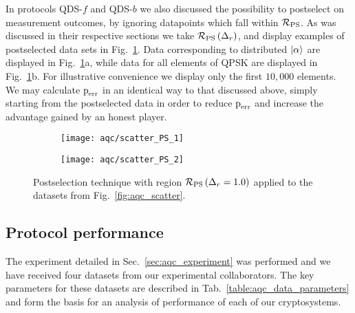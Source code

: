 In protocols QDS-$f$ and QDS-$b$ we also discussed the possibility to postselect on measurement outcomes, by ignoring datapoints which fall within $\mathcal{R}_{\text{PS}}$. As was discussed in their respective sections we take $\mathcal{R}_{\text{PS}}\left(\Delta_r\right)$, and display examples of postselected data sets in Fig.~\ref{fig:aqc_ps}. Data corresponding to distributed $\ket{\alpha}$ are displayed in Fig.~\ref{fig:aqc_ps}a, while data for all elements of QPSK are displayed in Fig.~\ref{fig:aqc_ps}b. For illustrative convenience we display only the first $10,000$ elements. We may calculate $\text{p}_{\text{err}}$ in an identical way to that discussed above, simply starting from the postselected data in order to reduce $\text{p}_{\text{err}}$ and increase the advantage gained by an honest player.

\begin{figure}[htp]
\captionsetup{width=0.8\linewidth}
\centering
	\begin{subfigure}{0.49\linewidth}
	\centering
	\texttt{[image: aqc/scatter\_PS\_1]}
	\caption{}
	\end{subfigure}
	\begin{subfigure}{0.49\linewidth}
	\centering
	\texttt{[image: aqc/scatter\_PS\_2]}
	\caption{}
	\end{subfigure}
\caption{\label{fig:aqc_ps} Postselection technique with region $\mathcal{R}_{\text{PS}}\left(\Delta_r=1.0\right)$ applied to the datasets from Fig.~\ref{fig:aqc_scatter}.}
\end{figure}


\clearpage
\subsection{Protocol performance}\label{sec:aqc_performance}
The experiment detailed in Sec.~\ref{sec:aqc_experiment} was  performed and we have received four datasets from our experimental collaborators. The key parameters for these datasets are described in Tab.~\ref{table:aqc_data_parameters} and form the basis for an analysis of performance of each of our cryptosystems.

